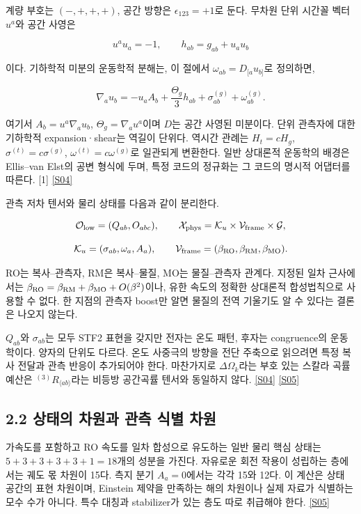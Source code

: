 \documentclass[11pt,a4paper]{article}
\begin{document}
계량 부호는 \((-,+,+,+)\), 공간 방향은 \(\epsilon_{123}=+1\)로 둔다. 무차원 단위 시간꼴 벡터 \(u^a\)와 공간 사영은


\[
u^a u_a=-1,\qquad h_{ab}=g_{ab}+u_a u_b
\]

이다. 기하학적 미분의 운동학적 분해는, 이 절에서 \(\omega_{ab}=D_{[a}u_{b]}\)로 정의하면,


\[
\nabla_a u_b=-u_a A_b+\frac{\Theta_g}{3}h_{ab}
+\sigma^{(g)}_{ab}+\omega^{(g)}_{ab}.
\]

여기서 \(A_b=u^a\nabla_a u_b\), \(\Theta_g=\nabla_a u^a\)이며 \(D\)는 공간 사영된 미분이다. 단위 관측자에 대한 기하학적 expansion·shear는 역길이 단위다. 역시간 관례는 \(H_t=cH_g\), \(\sigma^{(t)}=c\sigma^{(g)}\), \(\omega^{(t)}=c\omega^{(g)}\)로 일관되게 변환한다. 일반 상대론적 운동학의 배경은 Ellis–van Elst의 공변 형식에 두며, 특정 코드의 정규화는 그 코드의 명시적 어댑터를 따른다. [1] \hyperlink{src:S04}{[S04]}


관측 저차 텐서와 물리 상태를 다음과 같이 분리한다.


\[
\mathcal O_{\rm low}=(Q_{ab},O_{abc}),\qquad
\mathcal X_{\rm phys}=\mathcal K_u\times\mathcal V_{\rm frame}\times\mathcal G,
\]

\[
\mathcal K_u=(\sigma_{ab},\omega_a,A_a),\qquad
\mathcal V_{\rm frame}=(\beta_{\rm RO},\beta_{\rm RM},\beta_{\rm MO}).
\]

RO는 복사–관측자, RM은 복사–물질, MO는 물질–관측자 관계다. 지정된 일차 근사에서는 \(\beta_{\rm RO}=\beta_{\rm RM}+\beta_{\rm MO}+O(\beta^2)\)이나, 유한 속도의 정확한 상대론적 합성법칙으로 사용할 수 없다. 한 지점의 관측자 boost만 알면 물질의 전역 기울기도 알 수 있다는 결론은 나오지 않는다.


\(Q_{ab}\)와 \(\sigma_{ab}\)는 모두 STF2 표현을 갖지만 전자는 온도 패턴, 후자는 congruence의 운동학이다. 양자의 단위도 다르다. 온도 사중극의 방향을 전단 주축으로 읽으려면 특정 복사 전달과 관측 반응이 추가되어야 한다. 마찬가지로 \(\Delta\Omega_k\)라는 부호 있는 스칼라 곡률 예산은 \({}^{(3)}R_{\langle ab\rangle}\)라는 비등방 공간곡률 텐서와 동일하지 않다. \hyperlink{src:S04}{[S04]} \hyperlink{src:S05}{[S05]}


\subsection*{2.2 상태의 차원과 관측 식별 차원}

가속도를 포함하고 RO 속도를 일차 합성으로 유도하는 일반 물리 핵심 상태는 \(5+3+3+3+3+1=18\)개의 성분을 가진다. 자유로운 회전 작용이 성립하는 층에서는 궤도 몫 차원이 15다. 측지 분기 \(A_a=0\)에서는 각각 15와 12다. 이 계산은 상태 공간의 표현 차원이며, Einstein 제약을 만족하는 해의 차원이나 실제 자료가 식별하는 모수 수가 아니다. 특수 대칭과 stabilizer가 있는 층도 따로 취급해야 한다. \hyperlink{src:S05}{[S05]}
\end{document}
